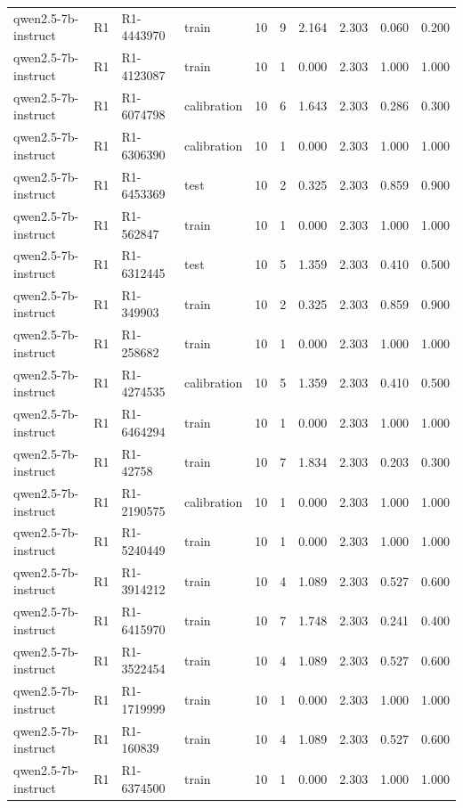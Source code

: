 \begin{table}
\begin{tabular}{llllrrrrrr}
qwen2.5-7b-instruct & R1 & R1-4443970 & train & 10 & 9 & 2.164 & 2.303 & 0.060 & 0.200 \\
qwen2.5-7b-instruct & R1 & R1-4123087 & train & 10 & 1 & 0.000 & 2.303 & 1.000 & 1.000 \\
qwen2.5-7b-instruct & R1 & R1-6074798 & calibration & 10 & 6 & 1.643 & 2.303 & 0.286 & 0.300 \\
qwen2.5-7b-instruct & R1 & R1-6306390 & calibration & 10 & 1 & 0.000 & 2.303 & 1.000 & 1.000 \\
qwen2.5-7b-instruct & R1 & R1-6453369 & test & 10 & 2 & 0.325 & 2.303 & 0.859 & 0.900 \\
qwen2.5-7b-instruct & R1 & R1-562847 & train & 10 & 1 & 0.000 & 2.303 & 1.000 & 1.000 \\
qwen2.5-7b-instruct & R1 & R1-6312445 & test & 10 & 5 & 1.359 & 2.303 & 0.410 & 0.500 \\
qwen2.5-7b-instruct & R1 & R1-349903 & train & 10 & 2 & 0.325 & 2.303 & 0.859 & 0.900 \\
qwen2.5-7b-instruct & R1 & R1-258682 & train & 10 & 1 & 0.000 & 2.303 & 1.000 & 1.000 \\
qwen2.5-7b-instruct & R1 & R1-4274535 & calibration & 10 & 5 & 1.359 & 2.303 & 0.410 & 0.500 \\
qwen2.5-7b-instruct & R1 & R1-6464294 & train & 10 & 1 & 0.000 & 2.303 & 1.000 & 1.000 \\
qwen2.5-7b-instruct & R1 & R1-42758 & train & 10 & 7 & 1.834 & 2.303 & 0.203 & 0.300 \\
qwen2.5-7b-instruct & R1 & R1-2190575 & calibration & 10 & 1 & 0.000 & 2.303 & 1.000 & 1.000 \\
qwen2.5-7b-instruct & R1 & R1-5240449 & train & 10 & 1 & 0.000 & 2.303 & 1.000 & 1.000 \\
qwen2.5-7b-instruct & R1 & R1-3914212 & train & 10 & 4 & 1.089 & 2.303 & 0.527 & 0.600 \\
qwen2.5-7b-instruct & R1 & R1-6415970 & train & 10 & 7 & 1.748 & 2.303 & 0.241 & 0.400 \\
qwen2.5-7b-instruct & R1 & R1-3522454 & train & 10 & 4 & 1.089 & 2.303 & 0.527 & 0.600 \\
qwen2.5-7b-instruct & R1 & R1-1719999 & train & 10 & 1 & 0.000 & 2.303 & 1.000 & 1.000 \\
qwen2.5-7b-instruct & R1 & R1-160839 & train & 10 & 4 & 1.089 & 2.303 & 0.527 & 0.600 \\
qwen2.5-7b-instruct & R1 & R1-6374500 & train & 10 & 1 & 0.000 & 2.303 & 1.000 & 1.000 \\

\end{tabular}
\end{table}
